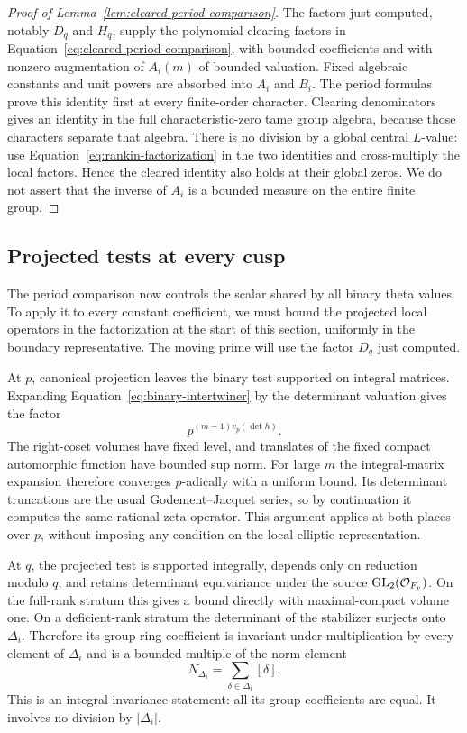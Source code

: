 \begin{proof}[Proof of Lemma~\ref{lem:cleared-period-comparison}]
The factors just computed, notably $D_q$ and $H_q$, supply the
polynomial clearing factors in
Equation~\ref{eq:cleared-period-comparison}, with bounded coefficients
and with nonzero augmentation of $A_i(m)$ of bounded valuation.
Fixed algebraic constants and unit powers are
absorbed into $A_i$ and $B_i$.  The period formulas prove this identity
first at every finite-order character.  Clearing denominators gives
an identity in the full characteristic-zero tame group algebra,
because those characters separate that algebra.  There is no division
by a global central $L$-value: use
Equation~\ref{eq:rankin-factorization} in the two identities and
cross-multiply the local factors.  Hence the cleared identity also
holds at their global zeros.  We do not assert that the inverse of
$A_i$ is a bounded measure on the entire finite group.

\end{proof}

\subsection{Projected tests at every cusp}

The period comparison now controls the scalar shared by all binary
theta values.  To apply it to every constant coefficient, we must bound
the projected local operators in the factorization at the start of
this section, uniformly in the boundary representative.  The moving
prime will use the factor $D_q$ just computed.

At $p$, canonical projection leaves the binary test supported on
integral matrices.  Expanding Equation~\ref{eq:binary-intertwiner} by
the determinant valuation gives the factor
\[
 p^{(m-1)v_p(\det h)}.
\]
The right-coset volumes have fixed level, and translates of the fixed
compact automorphic function have bounded sup norm.  For large $m$
the integral-matrix expansion therefore converges $p$-adically with a
uniform bound.  Its determinant truncations are the usual
Godement--Jacquet series, so by continuation it computes the same
rational zeta operator.  This argument applies at both places over
$p$, without imposing any condition on the local elliptic
representation.

At $q$, the projected test is supported integrally, depends only on
reduction modulo $q$, and retains determinant equivariance under the
source $\operatorname{GL}_2(\mathcal O_{F_v})$.  On the full-rank stratum this gives a bound
directly with maximal-compact volume one.  On a deficient-rank stratum
the determinant of the stabilizer surjects onto $\Delta_i$.  Therefore
its group-ring coefficient is invariant under multiplication by every
element of $\Delta_i$ and is a bounded multiple of the norm element
\[
 N_{\Delta_i}=\sum_{\delta\in\Delta_i}[\delta].
\]
This is an integral invariance statement: all its group coefficients
are equal.  It involves no division by $|\Delta_i|$.

